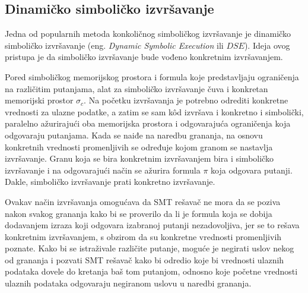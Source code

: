 \documentclass[12pt,oneside]{memoir}
\begin{document}
\subsection{Dinamičko simboličko izvršavanje}
Jedna od popularnih metoda konkoličnog simboličkog izvršavanje je dinamičko simboličko izvršavanje (eng. \textit{Dynamic Symbolic Execution} ili $DSE$). Ideja ovog pristupa je da simboličko izvršavanje bude vođeno konkretnim izvršavanjem. 

Pored simboličkog memorijskog prostora i formula koje predstavljaju ograničenja na različitim putanjama, alat za simboličko izvršavanje čuva i konkretan memorijski prostor $\sigma_c$. Na početku izvršavanja je potrebno odrediti konkretne vrednosti za ulazne podatke, a zatim se sam k\^od izvršava i konkretno i simbolički, paralelno ažurirajući oba memorijska prostora i odgovarajuća ograničenja koja odgovaraju putanjama. Kada se naiđe na naredbu grananja, na osnovu konkretnih vrednosti promenljivih se određuje kojom granom se nastavlja izvršavanje. Granu koja se bira konkretnim izvršavanjem bira i simboličko izvršavanje i na odgovarajući način se ažurira formula $\pi$ koja odgovara putanji. Dakle, simboličko izvršavanje prati konkretno izvršavanje. 

Ovakav način izvršavanja omogućava da SMT rešavač ne mora da se poziva nakon svakog grananja kako bi se proverilo da li je formula koja se dobija dodavanjem izraza koji odgovara izabranoj putanji nezadovoljiva, jer se to rešava konkretnim izvršavanjem, s obzirom da su konkretne vrednosti promenljivih poznate. Kako bi se istraživale različite putanje, moguće je negirati uslov nekog od grananja i pozvati SMT rešavač kako bi odredio koje bi vrednosti ulaznih podataka dovele do kretanja baš tom putanjom, odnosno koje početne vrednosti ulaznih podataka odgovaraju negiranom uslovu u naredbi grananja. 
\end{document}
